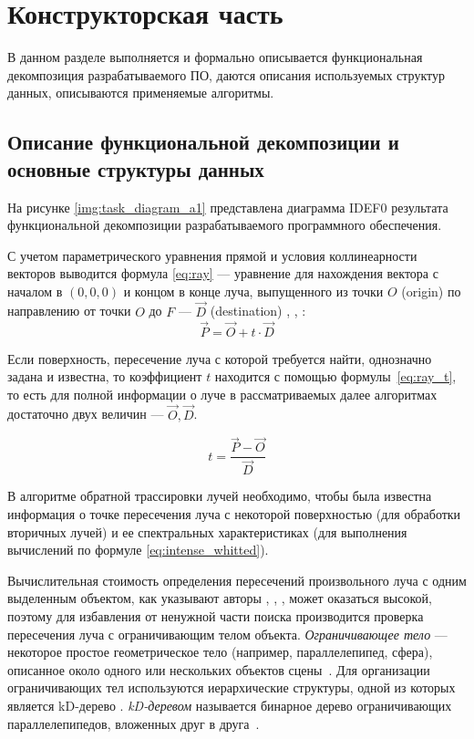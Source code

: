\chapter{Конструкторская часть}

В данном разделе выполняется и формально описывается функциональная декомпозиция разрабатываемого ПО, даются описания используемых структур данных, описываются применяемые алгоритмы.

\section{Описание функциональной декомпозиции и основные структуры данных}

На рисунке \ref{img:task_diagram_a1} представлена диаграмма IDEF0 результата функциональной декомпозиции разрабатываемого программного обеспечения.


С учетом параметрического уравнения прямой и условия коллинеарности векторов выводится формула \ref{eq:ray} --- уравнение для нахождения вектора с началом в $(0, 0, 0)$ и концом в конце луча, выпущенного из точки $O$ (origin) по направлению от точки $O$ до $F$ --- $\overrightarrow{D}$ (destination) \cite{божко2007компьютерная}, \cite{роджерс}, \cite{боресков}:
\begin{equation}\label{eq:ray}
	\overrightarrow{P} = \overrightarrow{O} + t \cdot \overrightarrow{D}
\end{equation}

Если поверхность, пересечение луча с которой требуется найти, однозначно задана и известна, то коэффициент $t$ находится с помощью формулы~\ref{eq:ray_t}, то есть для полной информации о луче в рассматриваемых далее алгоритмах достаточно двух величин --- $\overrightarrow{O}, \overrightarrow{D}$.

\begin{equation}\label{eq:ray_t}
	t = \frac{\overrightarrow{P} - \overrightarrow{O}}{\overrightarrow{D}}
\end{equation}

В алгоритме обратной трассировки лучей необходимо, чтобы была известна информация о точке пересечения луча с некоторой поверхностью (для обработки вторичных лучей) и ее спектральных характеристиках (для выполнения вычислений по формуле \ref{eq:intense_whitted}).

Вычислительная стоимость определения пересечений произвольного луча с одним выделенным объектом, как указывают авторы \cite{божко2007компьютерная}, \cite{роджерс}, \cite{боресков}, может оказаться высокой, поэтому для избавления от ненужной части поиска производится проверка пересечения луча с ограничивающим телом объекта.
\textit{Ограничивающее тело} --- некоторое простое геометрическое тело (например, параллелепипед, сфера), описанное около одного или нескольких объектов сцены~\cite{боресков}.
Для организации ограничивающих тел используются иерархические структуры, одной из которых является kD-дерево \cite{боресков}.
\textit{kD-деревом} называется бинарное дерево ограничивающих параллелепипедов, вложенных друг в друга~\cite{боресков}.

